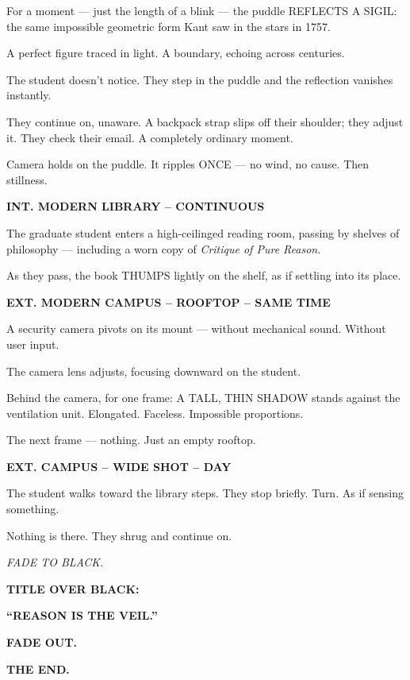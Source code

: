 \documentclass[12pt]{article}
\newcommand{\Scene}[1]{\vspace{1.2em}\textbf{#1}\vspace{0.8em}}
\newcommand{\Action}[1]{\vspace{0.4em}#1\vspace{0.4em}}
\newcommand{\Transition}[1]{\hfill\textit{#1}\vspace{1em}}
\begin{document}
\Action{For a moment — just the length of a blink —  
the puddle REFLECTS A SIGIL:  
the same impossible geometric form Kant saw in the stars in 1757.}

\Action{A perfect figure traced in light.  
A boundary, echoing across centuries.}

\Action{The student doesn’t notice.  
They step in the puddle and the reflection vanishes instantly.}

\Action{They continue on, unaware.  
A backpack strap slips off their shoulder; they adjust it.  
They check their email.  
A completely ordinary moment.}

\Action{Camera holds on the puddle.  
It ripples ONCE — no wind, no cause.  
Then stillness.}

\Scene{INT. MODERN LIBRARY – CONTINUOUS}

\Action{The graduate student enters a high-ceilinged reading room,  
passing by shelves of philosophy — including a worn copy of  
\textit{Critique of Pure Reason}.}

\Action{As they pass, the book THUMPS lightly on the shelf,  
as if settling into its place.}

\Scene{EXT. MODERN CAMPUS – ROOFTOP – SAME TIME}

\Action{A security camera pivots on its mount —  
without mechanical sound.  
Without user input.}

\Action{The camera lens adjusts, focusing downward on the student.}

\Action{Behind the camera, for one frame:  
A TALL, THIN SHADOW stands against the ventilation unit.  
Elongated. Faceless.  
Impossible proportions.}

\Action{The next frame — nothing.  
Just an empty rooftop.}

\Scene{EXT. CAMPUS – WIDE SHOT – DAY}

\Action{The student walks toward the library steps.  
They stop briefly.  
Turn.  
As if sensing something.}

\Action{Nothing is there.  
They shrug and continue on.}

\Transition{FADE TO BLACK.}

\Scene{TITLE OVER BLACK:}

\Action{\centering\textbf{“REASON IS THE VEIL.”}}

\Scene{FADE OUT.}

\Scene{THE END.}
\end{document}
